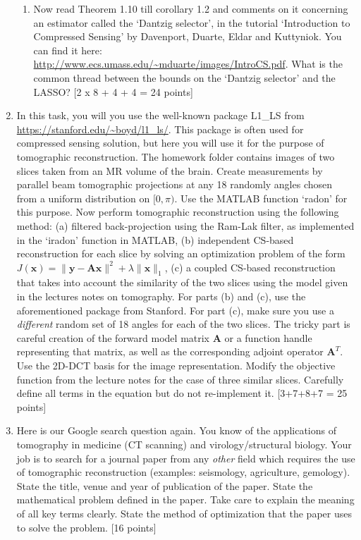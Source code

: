 \documentclass[11pt]{article}
\begin{document}
\begin{enumerate}
\begin{enumerate}
\item Now read Theorem 1.10 till corollary 1.2 and comments on it concerning an estimator called the `Dantzig selector', in the tutorial `Introduction to Compressed Sensing' by Davenport, Duarte, Eldar and Kuttyniok. You can find it here: \url{http://www.ecs.umass.edu/~mduarte/images/IntroCS.pdf}. What is the common thread between the bounds on the `Dantzig selector' and the LASSO? 
\textsf{[2 x 8 + 4 + 4 = 24 points]}
\end{enumerate}

\item In this task, you will you use the well-known package L1\_LS from \url{https://stanford.edu/~boyd/l1_ls/}. This package is often used for compressed sensing solution, but here you will use it for the purpose of tomographic reconstruction. The homework folder contains images of two slices taken from an MR volume of the brain. Create measurements by parallel beam tomographic projections at any 18 randomly angles chosen from a uniform distribution on $[0,\pi)$. Use the MATLAB function `radon' for this purpose. Now perform tomographic reconstruction using the following method: (a) filtered back-projection using the Ram-Lak filter, as implemented in the `iradon' function in MATLAB, (b) independent CS-based reconstruction for each slice by solving an optimization problem of the form $J(\boldsymbol{x}) = \|\boldsymbol{y}-\boldsymbol{Ax}\|^2 + \lambda \|\boldsymbol{x}\|_1$, (c) a coupled CS-based reconstruction that takes into account the similarity of the two slices using the model given in the lectures notes on tomography. For parts (b) and (c), use the aforementioned package from Stanford. For part (c), make sure you use a \emph{different} random set of 18 angles for each of the two slices. The tricky part is careful creation of the forward model matrix $\boldsymbol{A}$ or a function handle representing that matrix, as well as the corresponding adjoint operator $\boldsymbol{A}^T$. Use the 2D-DCT basis for the image representation. Modify the objective function from the lecture notes for the case of three similar slices. Carefully define all terms in the equation but do not re-implement it. \textsf{[3+7+8+7 = 25 points]}

\item Here is our Google search question again. You know of the applications of tomography in medicine (CT scanning) and virology/structural biology. Your job is to search for a journal paper from any \emph{other} field which requires the use of tomographic reconstruction (examples: seismology, agriculture, gemology). State the title, venue and year of publication of the paper. State the mathematical problem defined in the paper. Take care to explain the meaning of all key terms clearly. State the method of optimization that the paper uses to solve the problem. \textsf{[16 points]}


\end{enumerate}
\end{document}
